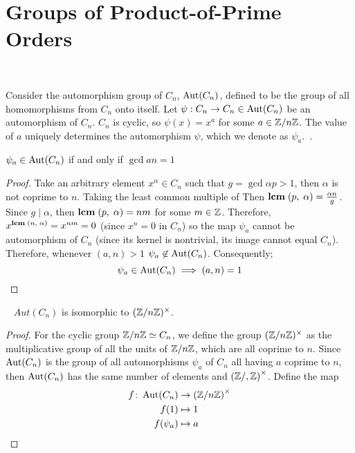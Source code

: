 \section{Groups of Product-of-Prime Orders}~\label{sec:main-theorem}

Consider the automorphism group of $C_n$, $\operatorname{Aut}(C_n)$,
defined to be the group of all homomorphisms from $C_n$ onto itself.
Let $\psi : C_n \to C_n \in \operatorname{Aut}(C_n)$ be an automorphism of $C_n$.
$C_n$ is cyclic, so $\psi(x) = x^a$ for some $a \in \mathbb{Z}/n\mathbb{Z}$.
The value of $a$ uniquely determines the automorphism $\psi$,
which we denote as $\psi_a$.~\cite[see DF Section 4.4, Proposition $16$]{DummitFoote}.


\begin{proposition}
  $\psi_a \in \operatorname{Aut}(C_n)$ if and only if $\gcd{a}{n} = 1$

  \begin{proof}
    Take an arbitrary element $x^\alpha \in C_n$
    such that $g = \gcd{\alpha}{p} > 1$, then $\alpha$ is not coprime to $n$.
    Taking the least common multiple of
    Then $\mathbf{lcm}\;(p,\;\alpha) = \frac{\alpha n}{g}$.
    Since $g \mid \alpha$, then $\mathbf{lcm}\;(p,\;\alpha) = nm$ for some $m \in \mathbb{Z}$.
    Therefore, $x^{\mathbf{lcm}\;(n,\;\alpha)} = x^{nm} = 0$ (since $x^n = 0$ in $C_n$)
    so the map $\psi_a$ cannot be automorphism of $C_n$
    (since its kernel is nontrivial, its image cannot equal $C_n$).
    Therefore, whenever $(a, n) > 1$ $\psi_a \not\in \operatorname{Aut}(C_n)$. Consequently;
    \[ \psi_a \in \operatorname{Aut}(C_n) \implies (a, n) = 1 \]
    
  \end{proof}
\end{proposition}

\begin{proposition}~\label{prop:aut-cyclic}
  $Aut(C_n)$ is isomorphic to $(\mathbb{Z}/n\mathbb{Z})^\times$.

  \begin{proof}
    For the cyclic group $\mathbb{Z}/n\mathbb{Z} \simeq C_n$, we define the group
    ${(\mathbb{Z}/n\mathbb{Z})^\times}$ as the multiplicative  group of all the units of $\mathbb{Z}/n\mathbb{Z}$,
    which are all coprime to $n$.
    Since $\operatorname{Aut}(C_n)$ is the group of all automorphisms $\psi_a$ of $C_n$
    all having $a$ coprime to $n$, then $\operatorname{Aut}(C_n)$ has the same number of elements
    and ${(\mathbb{Z}/,\mathbb{Z})}^\times$. Define the map
    \begin{align*}
      f \colon \operatorname{Aut}(C_n) &\to {(\mathbb{Z}/n\mathbb{Z})}^\times \\
      f(1) &\mapsto 1 \\
      f(\psi_a) &\mapsto a
    \end{align*}
  \end{proof}
\end{proposition}

